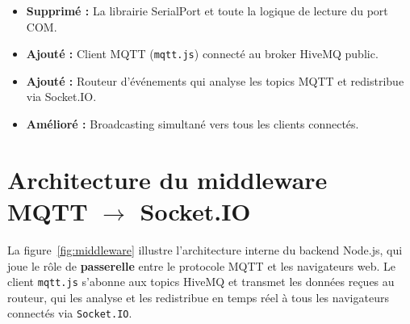 \documentclass[12pt, a4paper]{report}
\begin{document}
\begin{evolutionbox}
\begin{itemize}[leftmargin=0.8cm, itemsep=3pt]
  \item[\ding{55}] \textbf{Supprim\'e :} La librairie SerialPort et
        toute la logique de lecture du port COM.
  \item[\ding{51}] \textbf{Ajout\'e :} Client MQTT (\texttt{mqtt.js})
        connect\'e au broker HiveMQ public.
  \item[\ding{51}] \textbf{Ajout\'e :} Routeur d'\'ev\'enements qui
        analyse les topics MQTT et redistribue via Socket.IO.
  \item[\ding{51}] \textbf{Am\'elior\'e :} Broadcasting simultan\'e
        vers tous les clients connect\'es.
\end{itemize}
\end{evolutionbox}

\section{Architecture du middleware MQTT $\rightarrow$ Socket.IO}

La figure~\ref{fig:middleware} illustre l'architecture interne du
backend Node.js, qui joue le r\^ole de \textbf{passerelle} entre le
protocole MQTT et les navigateurs web. Le client \texttt{mqtt.js}
s'abonne aux topics HiveMQ et transmet les donn\'ees re\c{c}ues au
routeur, qui les analyse et les redistribue en temps r\'eel \`a tous
les navigateurs connect\'es via \texttt{Socket.IO}.
\end{document}
